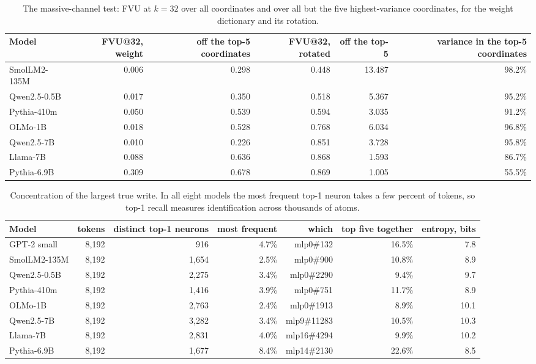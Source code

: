 \begin{table}[H]\centering\footnotesize
\caption{The massive-channel test: FVU at $k=32$ over all coordinates and over all but the five highest-variance coordinates, for the weight dictionary and its rotation.}\label{app:channels}
\begin{adjustbox}{max width=\linewidth}
\begin{tabular}{lrrrrr}\toprule
Model & FVU@32, weight & off the top-5 coordinates & FVU@32, rotated & off the top-5 & variance in the top-5 coordinates \\ \midrule
SmolLM2-135M & 0.006 & 0.298 & 0.448 & 13.487 & 98.2\% \\
Qwen2.5-0.5B & 0.017 & 0.350 & 0.518 & 5.367 & 95.2\% \\
Pythia-410m & 0.050 & 0.539 & 0.594 & 3.035 & 91.2\% \\
OLMo-1B & 0.018 & 0.528 & 0.768 & 6.034 & 96.8\% \\
Qwen2.5-7B & 0.010 & 0.226 & 0.851 & 3.728 & 95.8\% \\
Llama-7B & 0.088 & 0.636 & 0.868 & 1.593 & 86.7\% \\
Pythia-6.9B & 0.309 & 0.678 & 0.869 & 1.005 & 55.5\% \\
\bottomrule\end{tabular}\end{adjustbox}
\end{table}
\begin{table}[H]\centering\footnotesize
\caption{Concentration of the largest true write. In all eight models the most frequent top-1 neuron takes a few percent of tokens, so top-1 recall measures identification across thousands of atoms.}\label{app:conc}
\begin{adjustbox}{max width=\linewidth}
\begin{tabular}{lrrrrrr}\toprule
Model & tokens & distinct top-1 neurons & most frequent & which & top five together & entropy, bits \\ \midrule
GPT-2 small & 8,192 & 916 & 4.7\% & mlp0\#132 & 16.5\% & 7.8 \\
SmolLM2-135M & 8,192 & 1,654 & 2.5\% & mlp0\#900 & 10.8\% & 8.9 \\
Qwen2.5-0.5B & 8,192 & 2,275 & 3.4\% & mlp0\#2290 & 9.4\% & 9.7 \\
Pythia-410m & 8,192 & 1,416 & 3.9\% & mlp0\#751 & 11.7\% & 8.9 \\
OLMo-1B & 8,192 & 2,763 & 2.4\% & mlp0\#1913 & 8.9\% & 10.1 \\
Qwen2.5-7B & 8,192 & 3,282 & 3.4\% & mlp9\#11283 & 10.5\% & 10.3 \\
Llama-7B & 8,192 & 2,831 & 4.0\% & mlp16\#4294 & 9.9\% & 10.2 \\
Pythia-6.9B & 8,192 & 1,677 & 8.4\% & mlp14\#2130 & 22.6\% & 8.5 \\
\bottomrule\end{tabular}\end{adjustbox}
\end{table}
